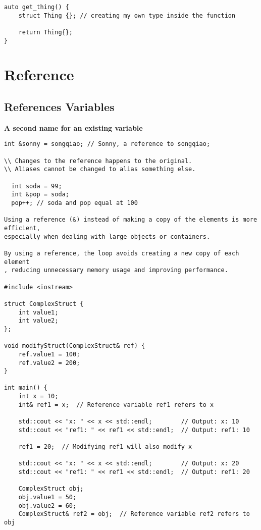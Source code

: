 \begin{verbatim}
auto get_thing() {
    struct Thing {}; // creating my own type inside the function 

    return Thing{};
}
\end{verbatim}

\section{Reference}
\subsection{References Variables}

\textbf{A second name for an existing variable}

\begin{verbatim}
int &sonny = songqiao; // Sonny, a reference to songqiao;

\\ Changes to the reference happens to the original.
\\ Aliases cannot be changed to alias something else.

  int soda = 99;
  int &pop = soda;
  pop++; // soda and pop equal at 100

Using a reference (&) instead of making a copy of the elements is more efficient,
especially when dealing with large objects or containers. 

By using a reference, the loop avoids creating a new copy of each element
, reducing unnecessary memory usage and improving performance.

#include <iostream>

struct ComplexStruct {
    int value1;
    int value2;
};

void modifyStruct(ComplexStruct& ref) {
    ref.value1 = 100;
    ref.value2 = 200;
}

int main() {
    int x = 10;
    int& ref1 = x;  // Reference variable ref1 refers to x

    std::cout << "x: " << x << std::endl;        // Output: x: 10
    std::cout << "ref1: " << ref1 << std::endl;  // Output: ref1: 10

    ref1 = 20;  // Modifying ref1 will also modify x

    std::cout << "x: " << x << std::endl;        // Output: x: 20
    std::cout << "ref1: " << ref1 << std::endl;  // Output: ref1: 20

    ComplexStruct obj;
    obj.value1 = 50;
    obj.value2 = 60;
    ComplexStruct& ref2 = obj;  // Reference variable ref2 refers to obj


\end{verbatim}
